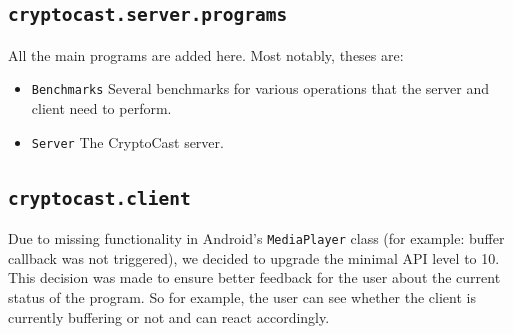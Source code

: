 \documentclass[a4paper,10pt]{scrartcl}
\begin{document}
\subsection{\lstinline|cryptocast.server.programs|}
All the main programs are added here. Most notably, theses are:
\begin{itemize}
 \item \lstinline|Benchmarks| Several benchmarks for various operations that the
   server and client need to perform.
 \item \lstinline|Server|  The CryptoCast server.
\end{itemize}

\subsection{\lstinline|cryptocast.client|}

Due to missing functionality in Android's \lstinline|MediaPlayer| class (for example: buffer callback was not triggered), we decided to upgrade the minimal API level to 10. This decision was made to ensure better feedback for the user about the current status of the program. So for example, the user can see whether the client is currently buffering or not and can react accordingly.
\end{document}
